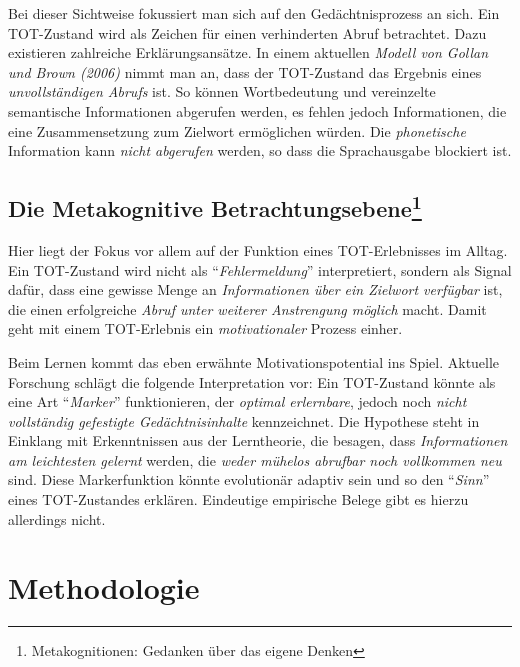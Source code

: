 \documentclass[
  letterpaper,
]{scrbook}
\begin{document}
Bei dieser Sichtweise fokussiert man sich auf den Gedächtnisprozess an
sich. Ein TOT-Zustand wird als Zeichen für einen verhinderten Abruf
betrachtet. Dazu existieren zahlreiche Erklärungsansätze. In einem
aktuellen \emph{Modell von Gollan und Brown (2006)} nimmt man an, dass
der TOT-Zustand das Ergebnis eines \emph{unvollständigen Abrufs} ist. So
können Wortbedeutung und vereinzelte semantische Informationen abgerufen
werden, es fehlen jedoch Informationen, die eine Zusammensetzung zum
Zielwort ermöglichen würden. Die \emph{phonetische} Information kann
\emph{nicht abgerufen} werden, so dass die Sprachausgabe blockiert ist.

\hypertarget{die-metakognitive-betrachtungsebene}{%
\subsection[Die Metakognitive Betrachtungsebene]{\texorpdfstring{Die
Metakognitive
Betrachtungsebene\footnote{Metakognitionen: Gedanken über das eigene
  Denken}}{Die Metakognitive Betrachtungsebene}}\label{die-metakognitive-betrachtungsebene}}

Hier liegt der Fokus vor allem auf der Funktion eines TOT-Erlebnisses im
Alltag. Ein TOT-Zustand wird nicht als ``\emph{Fehlermeldung}''
interpretiert, sondern als Signal dafür, dass eine gewisse Menge an
\emph{Informationen über ein Zielwort verfügbar} ist, die einen
erfolgreiche \emph{Abruf unter weiterer Anstrengung möglich} macht.
Damit geht mit einem TOT-Erlebnis ein \emph{motivationaler} Prozess
einher.

Beim Lernen kommt das eben erwähnte Motivationspotential ins Spiel.
Aktuelle Forschung schlägt die folgende Interpretation vor: Ein
TOT-Zustand könnte als eine Art ``\emph{Marker}'' funktionieren, der
\emph{optimal erlernbare}, jedoch noch \emph{nicht vollständig
gefestigte Gedächtnisinhalte} kennzeichnet. Die Hypothese steht in
Einklang mit Erkenntnissen aus der Lerntheorie, die besagen, dass
\emph{Informationen am leichtesten gelernt} werden, die \emph{weder
mühelos abrufbar noch vollkommen neu} sind. Diese Markerfunktion könnte
evolutionär adaptiv sein und so den ``\emph{Sinn}'' eines TOT-Zustandes
erklären. Eindeutige empirische Belege gibt es hierzu allerdings nicht.

\hypertarget{methodologie}{%
\section{Methodologie}\label{methodologie}}
\end{document}
